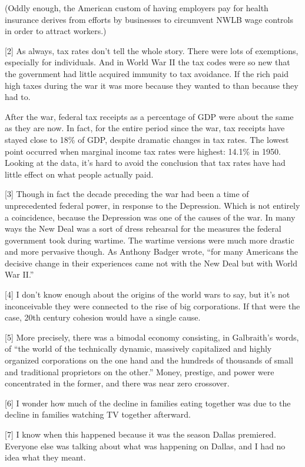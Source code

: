 (Oddly enough, the American custom of having employers pay for health
insurance derives from efforts by businesses to circumvent NWLB wage
controls in order to attract workers.)

{[}2{]} As always, tax rates don't tell the whole story. There were lots
of exemptions, especially for individuals. And in World War II the tax
codes were so new that the government had little acquired immunity to
tax avoidance. If the rich paid high taxes during the war it was more
because they wanted to than because they had to.

After the war, federal tax receipts as a percentage of GDP were about
the same as they are now. In fact, for the entire period since the war,
tax receipts have stayed close to 18\% of GDP, despite dramatic changes
in tax rates. The lowest point occurred when marginal income tax rates
were highest: 14.1\% in 1950. Looking at the data, it's hard to avoid
the conclusion that tax rates have had little effect on what people
actually paid.

{[}3{]} Though in fact the decade preceding the war had been a time of
unprecedented federal power, in response to the Depression. Which is not
entirely a coincidence, because the Depression was one of the causes of
the war. In many ways the New Deal was a sort of dress rehearsal for the
measures the federal government took during wartime. The wartime
versions were much more drastic and more pervasive though. As Anthony
Badger wrote, ``for many Americans the decisive change in their
experiences came not with the New Deal but with World War II.''

{[}4{]} I don't know enough about the origins of the world wars to say,
but it's not inconceivable they were connected to the rise of big
corporations. If that were the case, 20th century cohesion would have a
single cause.

{[}5{]} More precisely, there was a bimodal economy consisting, in
Galbraith's words, of ``the world of the technically dynamic, massively
capitalized and highly organized corporations on the one hand and the
hundreds of thousands of small and traditional proprietors on the
other.'' Money, prestige, and power were concentrated in the former, and
there was near zero crossover.

{[}6{]} I wonder how much of the decline in families eating together was
due to the decline in families watching TV together afterward.

{[}7{]} I know when this happened because it was the season Dallas
premiered. Everyone else was talking about what was happening on Dallas,
and I had no idea what they meant.

